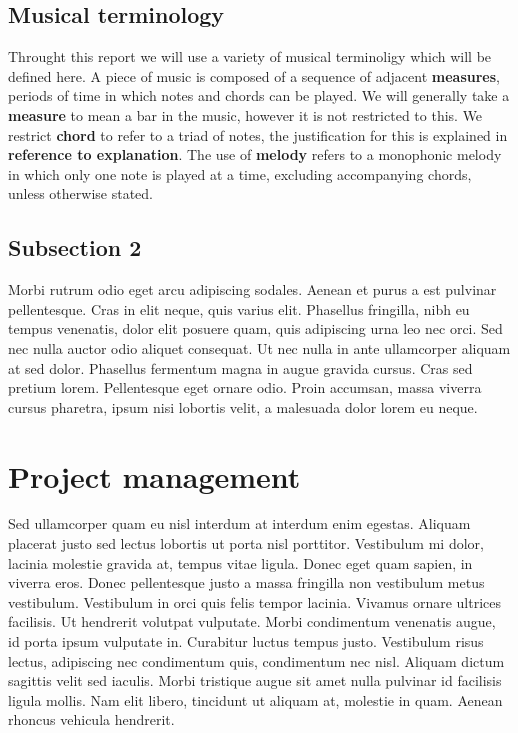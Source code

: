\subsection{Musical terminology}

Throught this report we will use a variety of musical terminoligy which will be defined here. A piece of music is composed of a sequence of adjacent \textbf{measures}, periods of time in which notes and chords can be played. 
We will generally take a \textbf{measure} to mean a bar in the music, however it is not restricted to this. We restrict \textbf{chord} to refer to a triad of notes, the justification for this is explained in \textbf{reference to explanation}.
The use of \textbf{melody} refers to a monophonic melody in which only one note is played at a time, excluding accompanying chords, unless otherwise stated.

\subsection{Subsection 2}
Morbi rutrum odio eget arcu adipiscing sodales. Aenean et purus a est pulvinar pellentesque. Cras in elit neque, quis varius elit. Phasellus fringilla, nibh eu tempus venenatis, dolor elit posuere quam, quis adipiscing urna leo nec orci. Sed nec nulla auctor odio aliquet consequat. Ut nec nulla in ante ullamcorper aliquam at sed dolor. Phasellus fermentum magna in augue gravida cursus. Cras sed pretium lorem. Pellentesque eget ornare odio. Proin accumsan, massa viverra cursus pharetra, ipsum nisi lobortis velit, a malesuada dolor lorem eu neque.


\section{Project management}

Sed ullamcorper quam eu nisl interdum at interdum enim egestas. Aliquam placerat justo sed lectus lobortis ut porta nisl porttitor. Vestibulum mi dolor, lacinia molestie gravida at, tempus vitae ligula. Donec eget quam sapien, in viverra eros. Donec pellentesque justo a massa fringilla non vestibulum metus vestibulum. Vestibulum in orci quis felis tempor lacinia. Vivamus ornare ultrices facilisis. Ut hendrerit volutpat vulputate. Morbi condimentum venenatis augue, id porta ipsum vulputate in. Curabitur luctus tempus justo. Vestibulum risus lectus, adipiscing nec condimentum quis, condimentum nec nisl. Aliquam dictum sagittis velit sed iaculis. Morbi tristique augue sit amet nulla pulvinar id facilisis ligula mollis. Nam elit libero, tincidunt ut aliquam at, molestie in quam. Aenean rhoncus vehicula hendrerit.


